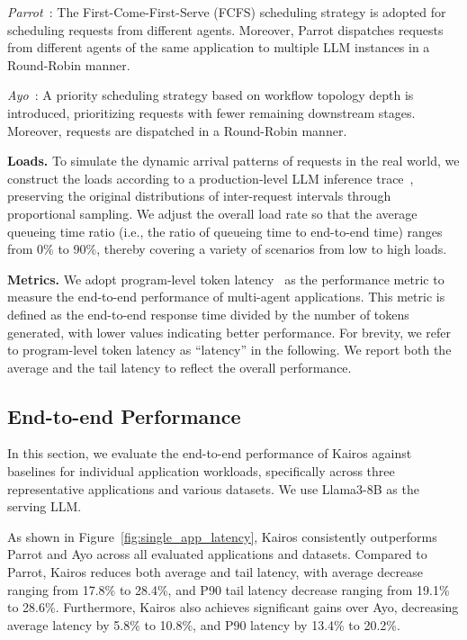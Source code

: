 \documentclass[sigplan,nonacm]{acmart}
\newcommand{\system}{Kairos}
\begin{document}
\textit{Parrot~\cite{10.5555/3691938.3691988}}: The First-Come-First-Serve (FCFS) scheduling strategy is adopted for scheduling requests from different agents.
Moreover, Parrot dispatches requests from different agents of the same application to multiple LLM instances in a Round-Robin manner.

\textit{Ayo~\cite{10.1145/3676641.3716278}}: A priority scheduling strategy based on workflow topology depth is introduced, prioritizing requests with fewer remaining downstream stages. Moreover, requests are dispatched in a Round-Robin manner.


\textbf{Loads.} To simulate the dynamic arrival patterns of requests in the real world, we construct the loads according to a production-level LLM inference trace~\cite{10609649}, preserving the original distributions of inter-request intervals through proportional sampling. We adjust the overall load rate so that the average queueing time ratio (i.e., the ratio of queueing time to end-to-end time) ranges from 0\% to 90\%, thereby covering a variety of scenarios from low to high loads. 


\textbf{Metrics.} We adopt program-level token latency~\cite{luo2025autellix} as the performance metric to measure the end-to-end performance of multi-agent applications. This metric is defined as the end-to-end response time divided by the number of tokens generated,
with lower values indicating better performance. 
For brevity, we refer to program-level token latency as ``latency'' in the following. We report both the average and the tail latency to reflect the overall performance.

\subsection{End-to-end Performance}
\label{sec:single_e2e}

In this section, we evaluate the end-to-end performance of \system{} against baselines for individual application workloads, specifically across three representative applications and various datasets. We use Llama3-8B as the serving LLM.



As shown in Figure~\ref{fig:single_app_latency}, \system{} consistently outperforms Parrot and Ayo across all evaluated applications and datasets. Compared to Parrot, \system{} reduces both average and tail latency, with average decrease ranging from 17.8\% to 28.4\%, and P90 tail latency decrease ranging from 19.1\% to 28.6\%. Furthermore, \system{} also achieves significant gains over Ayo, decreasing average latency by 5.8\% to 10.8\%, and P90 latency by 13.4\% to 20.2\%.
\end{document}
